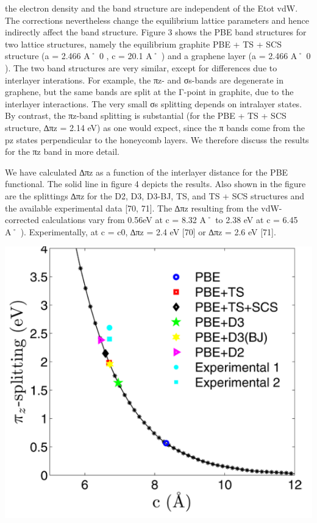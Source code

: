 \documentclass{article}
\begin{document}
the electron density and the band structure are independent of the Etot vdW. The corrections nevertheless change the equilibrium lattice parameters and hence indirectly affect the band structure. Figure 3 shows the PBE band structures for two lattice structures, namely the equilibrium graphite PBE + TS + SCS structure (a = 2.466 A˚ 0 , c = 20.1 A˚ ) and a graphene layer (a = 2.466 A˚ 0 ). The two band structures are very similar, except for differences due to interlayer interations. For example, the πz- and σs-bands are degenerate in graphene, but the same bands are split at the Γ-point in graphite, due to the interlayer interactions. The very small σs splitting depends on intralayer states. By contrast, the πz-band splitting is substantial (for the PBE + TS + SCS structure, ∆πz = 2.14 eV) as one would expect, since the π bands come from the pz states perpendicular to the honeycomb layers. We therefore discuss the results for the πz band in more detail.

We have calculated ∆πz as a function of the interlayer distance for the PBE functional. The solid line in figure 4 depicts the results. Also shown in the figure are the splittings ∆πz for the D2, D3, D3-BJ, TS, and TS + SCS structures and the available experimental data [70, 71]. The ∆πz resulting from the vdW-corrected calculations vary from 0.56eV at c = 8.32 A˚ to 2.38 eV at c = 6.45 A˚ ). Experimentally, at c = c0, ∆πz = 2.4 eV [70] or ∆πz = 2.6 eV [71].


\includegraphics{_page_9_Figure_1.png}
\end{document}
